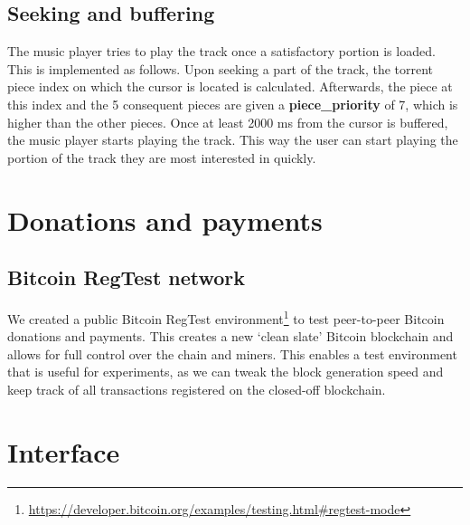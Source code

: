 \subsection{Seeking and buffering}
The music player tries to play the track once a satisfactory portion is loaded. This is implemented as follows. Upon seeking a part of the track, the torrent piece index on which the cursor is located is calculated. Afterwards, the piece at this index and the 5 consequent pieces are given a \textbf{piece\_priority} of 7, which is higher than the other pieces. Once at least 2000 ms from the cursor is buffered, the music player starts playing the track. This way the user can start playing the portion of the track they are most interested in quickly.
\section{Donations and payments}
\subsection{Bitcoin RegTest network}
We created a public Bitcoin RegTest environment\footnote{\url{https://developer.bitcoin.org/examples/testing.html\#regtest-mode}} to test peer-to-peer Bitcoin donations and payments. This creates a new `clean slate' Bitcoin blockchain and allows for full control over the chain and miners. This enables a test environment that is useful for experiments, as we can tweak the block generation speed and keep track of all transactions registered on the closed-off blockchain.
\label{sec:regtest-network-impl}
\section{Interface}
